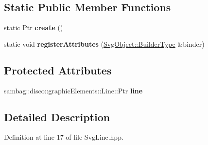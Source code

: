 \subsection*{Static Public Member Functions}
\begin{DoxyCompactItemize}
\item 
\hypertarget{classsambag_1_1disco_1_1svg_1_1_svg_line_ade22e529c325991ced1af206998bad76}{
static Ptr {\bfseries create} ()}
\label{classsambag_1_1disco_1_1svg_1_1_svg_line_ade22e529c325991ced1af206998bad76}

\item 
\hypertarget{classsambag_1_1disco_1_1svg_1_1_svg_line_aa02807989c1f5cc0f5a5d471432d25d3}{
static void {\bfseries registerAttributes} (\hyperlink{classsambag_1_1xml_1_1_x_m_l2_object}{SvgObject::BuilderType} \&binder)}
\label{classsambag_1_1disco_1_1svg_1_1_svg_line_aa02807989c1f5cc0f5a5d471432d25d3}

\end{DoxyCompactItemize}
\subsection*{Protected Attributes}
\begin{DoxyCompactItemize}
\item 
\hypertarget{classsambag_1_1disco_1_1svg_1_1_svg_line_a5809901aa9ac6b40cf4a2f9ab2b1bbc7}{
sambag::disco::graphicElements::Line::Ptr {\bfseries line}}
\label{classsambag_1_1disco_1_1svg_1_1_svg_line_a5809901aa9ac6b40cf4a2f9ab2b1bbc7}

\end{DoxyCompactItemize}


\subsection{Detailed Description}


Definition at line 17 of file SvgLine.hpp.




